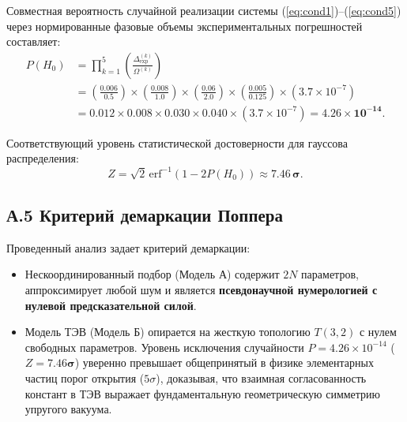 \documentclass[11pt,a4paper]{article}
\theoremstyle{definition}
\theoremstyle{remark}
\begin{document}
Совместная вероятность случайной реализации системы (\ref{eq:cond1})--(\ref{eq:cond5}) через нормированные фазовые объемы экспериментальных погрешностей составляет:
\begin{align}
    P(H_0) &= \prod_{k=1}^5 \left( \frac{\Delta_{\mathrm{exp}}^{(k)}}{\Omega^{(k)}} \right) \nonumber \\
    &= \left(\frac{0.006}{0.5}\right) \times \left(\frac{0.008}{1.0}\right) \times \left(\frac{0.06}{2.0}\right) \times \left(\frac{0.005}{0.125}\right) \times \left(3.7 \times 10^{-7}\right) \nonumber \\
    &= 0.012 \times 0.008 \times 0.030 \times 0.040 \times (3.7 \times 10^{-7}) = \mathbf{4.26 \times 10^{-14}}.
\end{align}

Соответствующий уровень статистической достоверности для гауссова распределения:
\begin{equation}
    Z = \sqrt{2} \, \mathrm{erf}^{-1}(1 - 2 P(H_0)) \approx \mathbf{7.46\,\sigma}.
\end{equation}

\subsection*{А.5 Критерий демаркации Поппера}
Проведенный анализ задает критерий демаркации:
\begin{itemize}
    \item Нескоординированный подбор (Модель А) содержит $2N$ параметров, аппроксимирует любой шум и является \textbf{псевдонаучной нумерологией с нулевой предсказательной силой}.
    \item Модель ТЭВ (Модель Б) опирается на жесткую топологию $T(3,2)$ с нулем свободных параметров. Уровень исключения случайности $P = 4.26 \times 10^{-14}$ ($Z = \mathbf{7.46\sigma}$) уверенно превышает общепринятый в физике элементарных частиц порог открытия ($5\sigma$), доказывая, что взаимная согласованность констант в ТЭВ выражает фундаментальную геометрическую симметрию упругого вакуума.
\end{itemize}
\FloatBarrier

\end{document}
